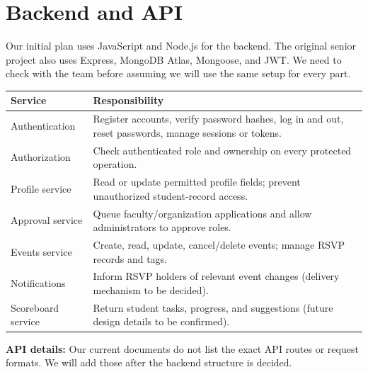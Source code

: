 \documentclass[11pt,letterpaper]{article}
\begin{document}
\section{Backend and API}
Our initial plan uses JavaScript and Node.js for the backend. The original senior project also uses Express, MongoDB Atlas, Mongoose, and JWT. We need to check with the team before assuming we will use the same setup for every part.
\begin{longtable}{p{}p{}}
\toprule Service & Responsibility \\ \midrule
Authentication & Register accounts, verify password hashes, log in and out, reset passwords, manage sessions or tokens.\\
Authorization & Check authenticated role and ownership on every protected operation.\\
Profile service & Read or update permitted profile fields; prevent unauthorized student-record access.\\
Approval service & Queue faculty/organization applications and allow administrators to approve roles.\\
Events service & Create, read, update, cancel/delete events; manage RSVP records and tags.\\
Notifications & Inform RSVP holders of relevant event changes (delivery mechanism to be decided).\\
Scoreboard service & Return student tasks, progress, and suggestions (future design details to be confirmed).\\
\bottomrule
\end{longtable}
\noindent\textbf{API details:} Our current documents do not list the exact API routes or request formats. We will add those after the backend structure is decided.
\end{document}

